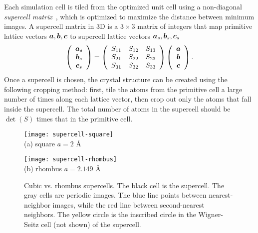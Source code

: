 Each simulation cell is tiled from the optimized unit cell using a non-diagonal \emph{supercell matrix}~\cite{Lloyd-Williams2015}, which is optimized to maximize the distance between minimum images.
A supercell matrix in 3D is a $3\times 3$ matrix of integers that map primitive lattice vectors $\boldsymbol{a}, \boldsymbol{b}, \boldsymbol{c}$ to supercell lattice vectors  $\boldsymbol{a}_s, \boldsymbol{b}_s, \boldsymbol{c}_s$
\begin{align}
\left(\begin{array}{c}
\boldsymbol{a}_s \\
\boldsymbol{b}_s \\
\boldsymbol{c}_s
\end{array}\right) =
\left(\begin{array}{ccc}
S_{11} & S_{12} & S_{13} \\
S_{21} & S_{22} & S_{23} \\
S_{31} & S_{32} & S_{33}
\end{array}\right)
\left(\begin{array}{c}
\boldsymbol{a} \\
\boldsymbol{b} \\
\boldsymbol{c}
\end{array}\right).
\end{align}
Once a supercell is chosen, the crystal structure can be created using the following cropping method: first, tile the atoms from the primitive cell a large number of times along each lattice vector, then crop out only the atoms that fall inside the supercell.
The total number of atoms in the supercell should be $\det(S)$ times that in the primitive cell.

\begin{figure}[h]
\centering
\begin{minipage}{0.49\textwidth}
\centering
\texttt{[image: supercell-square]}\\
(a) square $a=2$ \AA
\end{minipage}
\begin{minipage}{0.49\textwidth}
\centering
\texttt{[image: supercell-rhombus]}\\
(b) rhombus $a=2.149$ \AA
\end{minipage}
\caption{Cubic vs. rhombus supercells. The black cell is the supercell. The gray cells are periodic images. The blue line points between nearest-neighbor images, while the red line between second-nearest neighbors. The yellow circle is the inscribed circle in the Wigner-Seitz cell (not shown) of the supercell.}
\label{fig:hsolid-square-vs-rhombus}
\end{figure}

